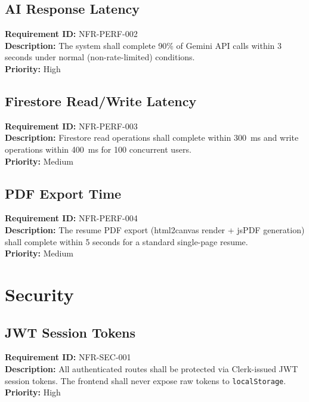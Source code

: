 \documentclass{fisatinternship}
\begin{document}
\vspace{0.3cm}

\subsection{AI Response Latency}
\textbf{Requirement ID:} NFR-PERF-002\\
\textbf{Description:} The system shall complete 90\% of Gemini API calls within 3 seconds
under normal (non-rate-limited) conditions.\\
\textbf{Priority:} High

\vspace{0.3cm}

\subsection{Firestore Read/Write Latency}
\textbf{Requirement ID:} NFR-PERF-003\\
\textbf{Description:} Firestore read operations shall complete within 300~ms and write
operations within 400~ms for 100 concurrent users.\\
\textbf{Priority:} Medium

\vspace{0.3cm}

\subsection{PDF Export Time}
\textbf{Requirement ID:} NFR-PERF-004\\
\textbf{Description:} The resume PDF export (html2canvas render + jsPDF generation) shall
complete within 5 seconds for a standard single-page resume.\\
\textbf{Priority:} Medium

\section{Security}

\subsection{JWT Session Tokens}
\textbf{Requirement ID:} NFR-SEC-001\\
\textbf{Description:} All authenticated routes shall be protected via Clerk-issued JWT
session tokens. The frontend shall never expose raw tokens to \texttt{localStorage}.\\
\textbf{Priority:} High
\end{document}
